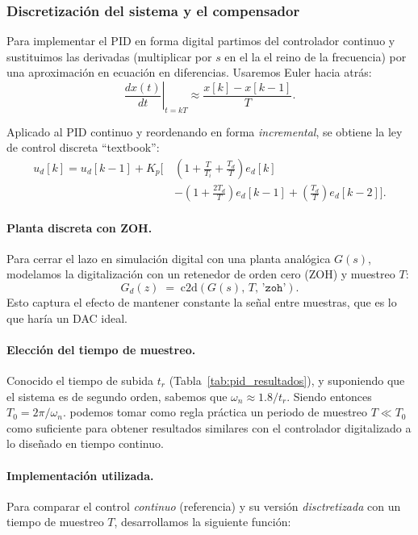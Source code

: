 \subsubsection{Discretización del sistema y el compensador}

Para implementar el PID en forma digital partimos del controlador continuo y sustituimos las derivadas (multiplicar por \(s\) en el la el reino de la frecuencia) por una aproximación en ecuación en diferencias. Usaremos Euler hacia atrás:
\[
\left.\frac{dx(t)}{dt}\right|_{t=kT} \approx \frac{x[k]-x[k-1]}{T}.
\]


Aplicado al PID continuo y reordenando en forma \emph{incremental}, se obtiene la ley de control discreta ``textbook'':
\begingroup\small
\begin{equation}
	\label{eq:pid_incremental}
	\begin{aligned}
		u_d[k] = u_d[k-1] + K_p \big[\, &
		\left(1+\tfrac{T}{T_i}+\tfrac{T_d}{T}\right)e_d[k] \\
		& -\left(1+\tfrac{2T_d}{T}\right)e_d[k-1]
		+\left(\tfrac{T_d}{T}\right)e_d[k-2] \big].
	\end{aligned}
\end{equation}
\endgroup



\paragraph{Planta discreta con ZOH.}
Para cerrar el lazo en simulación digital con una planta analógica \(G(s)\), modelamos la digitalización con un retenedor de orden cero (ZOH) y muestreo \(T\):
\[
G_d(z) \;=\; \mathrm{c2d}\!\left(G(s),\,T,\,\texttt{'zoh'}\right).
\]
Esto captura el efecto de mantener constante la señal entre muestras, que es lo que haría un DAC ideal.

\paragraph{Elección del tiempo de muestreo.}
Conocido el tiempo de subida \(t_r\) (Tabla~\ref{tab:pid_resultados}), y suponiendo que el sistema es de segundo orden, sabemos que  \( \omega_n \approx 1.8/t_r\). Siendo entonces \(T_0 = 2\pi/\omega_n\). podemos tomar como regla práctica un periodo de muestreo \(T\ll T_0\) como suficiente para obtener resultados similares con el controlador digitalizado a lo diseñado en tiempo continuo.




\paragraph{Implementación utilizada.}
Para comparar el control \emph{continuo} (referencia) y su versión \emph{disctretizada} con un tiempo de muestreo \(T\), desarrollamos la siguiente función:

